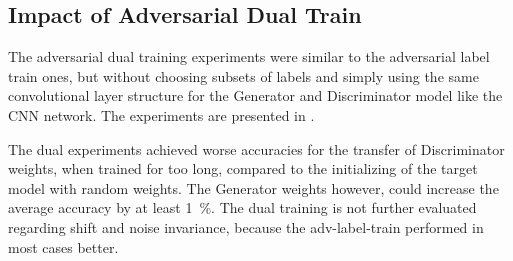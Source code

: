\subsection{Impact of Adversarial Dual Train}
The adversarial dual training experiments were similar to the adversarial label train ones, but without choosing subsets of labels and simply using the same convolutional layer structure for the Generator and Discriminator model like the CNN network.
The experiments are presented in .

The dual experiments achieved worse accuracies for the transfer of Discriminator weights, when trained for too long, compared to the initializing of the target model with random weights.
The Generator weights however, could increase the average accuracy by at least \SI{1}{\percent}.
The dual training is not further evaluated regarding shift and noise invariance, because the adv-label-train performed in most cases better.




